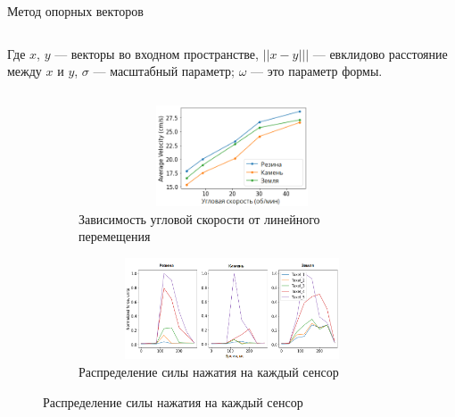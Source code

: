 \begin{frame}[t]{Метод опорных векторов}
\begin{columns}[T,onlytextwidth]
\begin{column}{0.49\textwidth}
            Где $x$, $y$ --- векторы во входном пространстве, $||x - y|||$ --- евклидово расстояние между $x$ и $y$, $\sigma$ --- масштабный параметр; $\omega$ --- это параметр формы.
        \end{column}
    \end{columns}
    \vspace{-0.4cm}
    \begin{figure}[H]
        \begin{subfigure}[t]{0.49\textwidth}
            \centering\includegraphics[height=3cm,width=1\textwidth,keepaspectratio]{../images/s_shape_leg/avg_lin_vel_rev_min.png}
            \caption*{Зависимость угловой скорости от линейного перемещения}
        \end{subfigure}
        \begin{subfigure}[t]{0.49\textwidth}
            \centering\includegraphics[height=3cm,width=1\textwidth,keepaspectratio]{../images/s_shape_leg/TaxelIndForce.png}
            \caption*{Распределение силы нажатия на каждый сенсор}
        \end{subfigure}
    \end{figure}
\end{frame}


